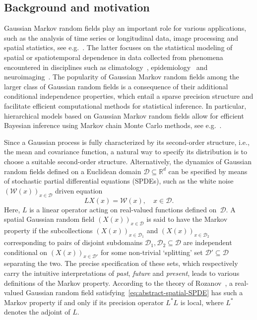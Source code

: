 \documentclass[reqno]{amsart}
\numberwithin{equation}{section}
\newcommand{\R}{\mathbb{R}}
\newcommand{\cD}{\mathcal{D}}
\newcommand{\cW}{\mathcal{W}}
\theoremstyle{remark}
\theoremstyle{definition}
\begin{document}
\subsection{Background and motivation}
Gaussian Markov random fields play an important role
for various applications, such as
the analysis of time series or longitudinal data, image processing and spatial statistics, 
see e.g.~\cite[Section~1.3]{Rue2005}.
The latter
focuses on the statistical modeling
of spatial or spatiotemporal
dependence in data
collected from phenomena encountered in disciplines 
such as 
climatology~\cite{Alexeeff2018}, 
epidemiology~\cite{Lawson2014} and 
neuroimaging~\cite{MejiaEtAl2020}. 
The popularity of Gaussian Markov random fields among
the larger class of Gaussian random fields is a consequence
of their additional conditional independence properties,
which entail a sparse precision structure and 
facilitate efficient computational methods for statistical inference.
In particular, hierarchical models based on Gaussian Markov random fields allow for efficient
Bayesian inference using Markov chain Monte Carlo methods, see e.g.~\cite[Section~4.1]{Rue2005}.

Since a Gaussian process is fully characterized 
by its second-order structure, i.e., 
the mean and covariance function, 
a natural way to specify its distribution is 
to choose a suitable second-order structure.  
Alternatively, the dynamics of Gaussian random fields defined on 
a Euclidean domain $\cD \subseteq \R^d$ can be specified
by means of stochastic partial differential equations 
(SPDEs), such as the white noise $(\cW(x))_{x\in\cD}$ driven equation 
%
\begin{equation}\label{eq:abstract-spatial-SPDE}
	L X(x) = \cW(x), \quad x \in \cD. 
\end{equation}
%
Here, $L$ is 
a linear operator 
acting on real-valued functions defined on~$\cD$.
A spatial
Gaussian random field $(X(x))_{x \in \cD}$ is said to have the Markov property
if the subcollections $(X(x))_{x \in \cD_{1}}$
and $(X(x))_{x \in \cD_{2}}$
corresponding to
pairs of disjoint subdomains $\cD_1, \cD_2 \subseteq \cD$
are independent
conditional on $(X(x))_{x \in \cD'}$ for 
some non-trivial `splitting' set $\cD' \subseteq \cD$ separating the two.
The precise specification of these sets, 
which respectively carry  
the intuitive interpretations
of \emph{past}, \emph{future} and \emph{present}, leads to 
various definitions of the Markov property.
According to the theory of Rozanov~\cite{Rozanov1982},    
a real-valued Gaussian random field 
satisfying~\eqref{eq:abstract-spatial-SPDE}
has such a Markov property
if and only if its
precision operator $L^*\! L$ is local, where $L^*$ denotes the adjoint of $L$.
\end{document}
